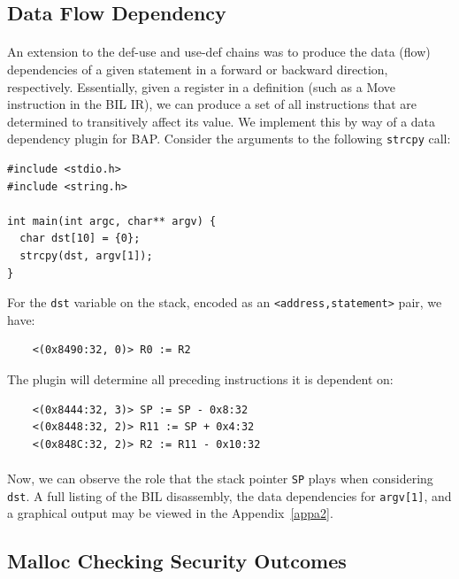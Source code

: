 \documentclass[letterpaper,11pt]{article}
\begin{document}
\subsection{Data Flow Dependency}

\paragraph{}
An extension to the def-use and use-def chains was to produce the data (flow)
dependencies of a given statement in a forward or backward direction,
respectively. Essentially, given a register in a definition (such as a Move
instruction in the BIL IR), we can produce a set of all instructions that are
determined to transitively affect its value. We implement this
by way of a data dependency plugin for BAP. Consider the arguments to the
following \texttt{strcpy} call:

\begin{center}
\lstset{language=C, label=strcpy,
caption=strcpy.c, breaklines=true, basicstyle=\tiny, numbers=none}
\begin{lstlisting}
#include <stdio.h>
#include <string.h>

int main(int argc, char** argv) {
  char dst[10] = {0};
  strcpy(dst, argv[1]);
}
\end{lstlisting}
\end{center}

For the \texttt{dst} variable on the stack, encoded as an
\texttt{<address,statement>} pair, we have:

\begin{verbatim}
    <(0x8490:32, 0)> R0 := R2
\end{verbatim}

The plugin will determine all preceding instructions it is dependent on:
\begin{verbatim}
    <(0x8444:32, 3)> SP := SP - 0x8:32
    <(0x8448:32, 2)> R11 := SP + 0x4:32
    <(0x848C:32, 2)> R2 := R11 - 0x10:32
\end{verbatim}

\paragraph{}
Now, we can observe the role that the stack pointer \texttt{SP} plays
when considering \texttt{dst}. A full listing of the BIL disassembly,
the data dependencies for \texttt{argv[1]}, and a graphical
output may be viewed in
the Appendix~\ref{appa2}.

\subsection{Malloc Checking Security Outcomes}

\end{document}
